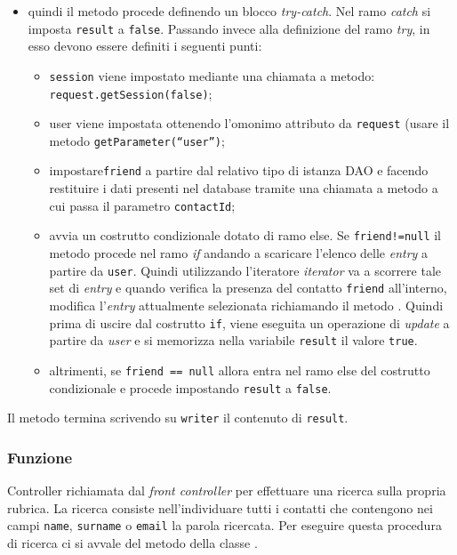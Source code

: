 \begin{description}
\begin{itemize}
		\item quindi il metodo procede definendo un blocco \textit{try-catch}. Nel ramo \textit{catch} si imposta \texttt{result} a \texttt{false}. Passando invece alla definizione del ramo \textit{try}, in esso devono essere definiti i seguenti punti:
		\begin{itemize}
			\item \texttt{session} viene impostato mediante una chiamata a metodo:
			\verb|request.getSession(false)|;
			\item user viene impostata ottenendo l'omonimo attributo da \texttt{request} (usare il metodo \texttt{getParameter(``user'')};
			\item impostare\texttt{friend} a partire dal relativo tipo di istanza DAO e facendo restituire i dati presenti nel database tramite una chiamata a metodo  a cui passa il parametro \texttt{contactId};
			\item avvia un costrutto condizionale dotato di ramo else. Se \texttt{friend!=null} il metodo procede nel ramo \textit{if} andando a scaricare l'elenco delle \textit{entry} a partire da \texttt{user}. Quindi utilizzando l'iteratore \textit{iterator} va a scorrere tale set di \textit{entry} e quando verifica la presenza del contatto \texttt{friend} all'interno, modifica l'\textit{entry} attualmente selezionata richiamando il metodo . Quindi prima di uscire dal costrutto \texttt{if}, viene eseguita un operazione di \textit{update} a partire da \textit{user} e si memorizza nella variabile \texttt{result} il valore \texttt{true}.
			\item altrimenti, se \texttt{friend == null} allora entra nel ramo else del costrutto condizionale e procede impostando \texttt{result} a \texttt{false}.
		\end{itemize}
	\end{itemize}
	Il metodo termina scrivendo su \texttt{writer} il contenuto di \texttt{result}.
	
\end{description}



\subsubsection*{Funzione}
Controller richiamata dal \textit{front controller} per effettuare una ricerca sulla propria rubrica. La ricerca consiste nell'individuare tutti i contatti che contengono nei campi \texttt{name}, \texttt{surname} o \texttt{email} la parola ricercata. Per eseguire questa procedura di ricerca ci si avvale del metodo  della classe .

